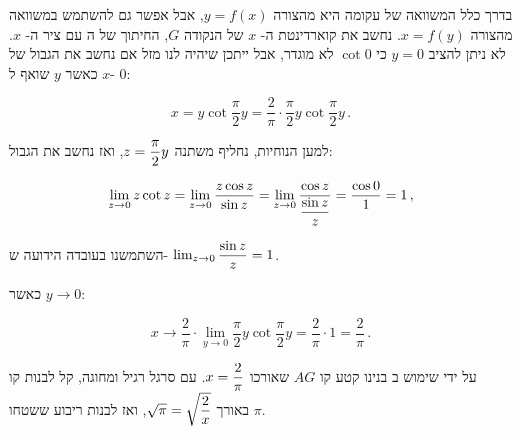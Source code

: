 בדרך כלל המשוואה של עקומה היא מהצורה
$y=f(x)$,
אבל אפשר גם להשתמש במשוואה מהצורה
$x=f(y)$.
נחשב את קוארדינטת ה-%
$x$
של הנקודה 
$G$,
החיתוך של ה%
\qd{}
עם ציר ה-%
$x$.
לא ניתן להציב
$y=0$
כי
$\cot 0$
לא מוגדר, אבל ייתכן שיהיה לנו מזל אם נחשב את הגבול של
$x$
כאשר 
$y$
שואף ל-%
$0$:

\[
x = y\cot \frac{\pi}{2}y = \frac{2}{\pi}\cdot \frac{\pi}{2}y\cot \frac{\pi}{2}y\,.
\]

למען הנוחיות, נחליף משתנה
$z=\displaystyle\frac{\pi}{2}y$,
ואז נחשב את הגבול:

\[
\lim_{z\rightarrow 0} z\cot z = \lim_{z\rightarrow 0} \frac{z\cos z}{\sin z} = \lim_{z\rightarrow 0} \frac{\cos z}{\displaystyle\frac{\sin z}{z}} = \frac{\cos 0}{1} = 1\,,
\]

השתמשנו בעובדה הידועה ש-%
$\lim_{z\rightarrow 0} \displaystyle\frac{\sin z}{z}=1$.

כאשר
$y\rightarrow 0$:

\[
x \rightarrow \frac{2}{\pi}\cdot \lim_{y\rightarrow 0}\frac{\pi}{2}y\cot \frac{\pi}{2}y = \frac{2}{\pi}\cdot 1 = \frac{2}{\pi}\,.
\]

על ידי שימוש ב%
\qd{}
בנינו קטע קו
$AG$
שאורכו
$x=\displaystyle\frac{2}{\pi}$.
עם סרגל רגיל ומחוגה, קל לבנות קו באורך
$\sqrt{\pi}=\sqrt{\displaystyle\frac{2}{x}}$,
ואז לבנות ריבוע ששטחו
$\pi$.

